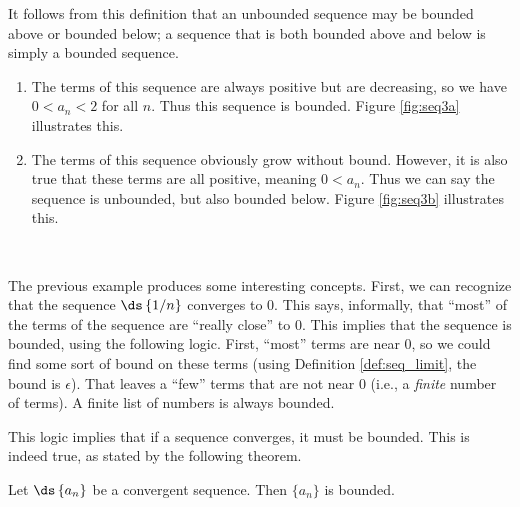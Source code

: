 It follows from this definition that an unbounded sequence may be bounded above or bounded below; a sequence that is both bounded above and below is simply a bounded sequence.\\

{\begin{enumerate}
\item		The terms of this sequence are always positive but are decreasing, so we have $0<a_n<2$ for all $n$. Thus this sequence is bounded. Figure \ref{fig:seq3a} illustrates this.


\item		The terms of this sequence obviously grow without bound. However, it is also true that these terms are all positive, meaning $0<a_n$. Thus we can say the sequence is unbounded, but also bounded below. Figure \ref{fig:seq3b} illustrates this.

\end{enumerate}
 \baselineskip
}\\


The previous example produces some interesting concepts. First, we can recognize that the sequence $\ds\left\{1/n\right\}$ converges to 0. This says, informally, that ``most'' of the terms of the sequence are ``really close'' to 0. This implies that the sequence is bounded, using the following logic. First, ``most'' terms are near 0, so we could find some sort of bound on these terms (using Definition \ref{def:seq_limit}, the bound is $\epsilon$). That leaves a ``few'' terms that are not near 0 (i.e., a \emph{finite} number of terms). A finite list of numbers is always bounded. 

This logic implies that if a sequence converges, it must be bounded. This is indeed true, as stated by the following theorem.

{Let $\ds \left\{a_n\right\}$ be a convergent sequence. Then $\{a_n\}$ is bounded.
}

